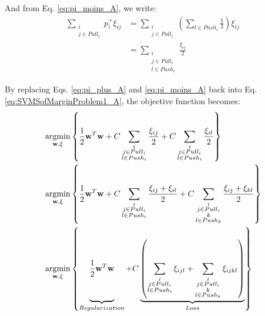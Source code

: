 \noindent And from Eq. \ref{eq:pi_moins_A}, we write:
\begin{align}
	\sum\limits_{\substack{i \\ j \in Pull_i}}p_i^+\xi_{ij} 
	& =
	\sum_{\substack{i \\ j \in Pull_i}} \left( \sum_{l \in Push_i} \frac{1}{2} \right) \xi_{ij} \\
	& =
	\sum_{\substack{i \\ j \in Pull_i \\ l \in Push_i}} \frac{\xi_{ij}}{2} \label{eq:pi_moins2}
\end{align}

\noindent By replacing Eqs. \ref{eq:pi_plus_A} and \ref{eq:pi_moins_A} back into Eq. \ref{eq:SVMSofMarginProblem1_A}, the objective function becomes:
\begin{align}
	&\displaystyle \argmin_{\textbf{w},\xi} \left\lbrace 
	\frac{1}{2}\textbf{w}^T \textbf{w}
	+ C\sum_{\substack{i \\ j \in Pull_i \\ l \in Push_i}}\frac{\xi_{ij}}{2} 
	+ C\sum_{\substack{i \\ j \in Pull_i \\ l \in Push_i}}\frac{\xi_{il}}{2} \right\rbrace \\
	&\displaystyle \argmin_{\textbf{w},\xi} \left\lbrace 
	\frac{1}{2}\textbf{w}^T \textbf{w}
	+ C\sum_{\substack{i \\ j \in Pull_i \\ l \in Push_i}}\frac{\xi_{ij}+\xi_{il}}{2} 
	+ C\sum_{\substack{i \\ j \in Pull_i \\ k \\l \in Push_k}}\frac{\xi_{ij}+\xi_{kl}}{2} \right\rbrace 
	\\
	&\displaystyle \argmin_{\textbf{w},\xi} \left\lbrace 
	\underbrace{ 
		\vphantom{ \sum\limits_{\substack{i \\ j \in Pull_i \\ k \\l \in Push_k}} }
		\frac{1}{2}\textbf{w}^T \textbf{w}
	}_{Regularization}
	+  C \underbrace{ \left( 
		\sum_{\substack{i \\ j \in Pull_i \\ l \in Push_i}}
		\xi_{ijl} 
	+ \sum_{\substack{i \\ j \in Pull_i \\ k \\l \in Push_k}}
		\xi_{ijkl} 	\right) 
	}_{Loss} \right\rbrace 
	\label{eq:svm2}
\end{align}	
%

